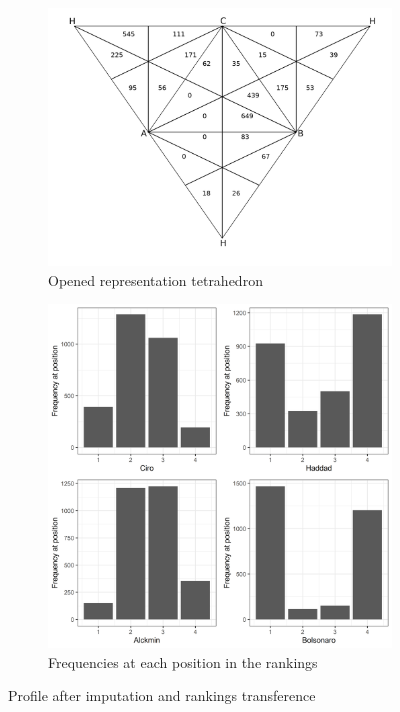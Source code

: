 \documentclass[hidelinks,11pt]{article} \usepackage[utf8]{inputenc}
\begin{document}
\begin{figure}[!h] \centering
  \begin{subfigure}[b]{0.8\textwidth} \centering
\includegraphics[width=\textwidth]{./images/representation_tetrahedron.png}
 \caption{Opened representation tetrahedron}
 \label{fig:rep_ot}
\end{subfigure} \hfill
  \begin{subfigure}[b]{0.8\textwidth} \centering
\includegraphics[width=\textwidth]{./images/corrected1_indexes_plot.png}
 \caption{Frequencies at each position in the rankings}
 \label{fig:counts}
\end{subfigure}
\caption{Profile after imputation and rankings transference}
\label{fig:profile_trans}
\end{figure}
\end{document}
